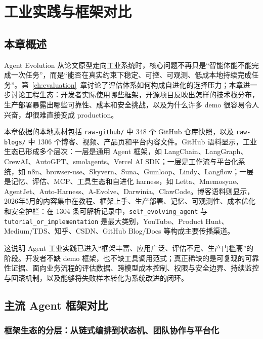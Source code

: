 
\section{工业实践与框架对比}\label{ch:industry}

\subsection{本章概述}\label{sec:ch6-overview}

Agent Evolution 从论文原型走向工业系统时，核心问题不再只是``智能体能不能完成一次任务''，而是``能否在真实约束下稳定、可控、可观测、低成本地持续完成任务''。第~\ref{ch:evaluation}~章讨论了评估体系如何构成自进化的选择压力；本章进一步讨论工程生态：开发者实际使用哪些框架，开源项目反映出怎样的技术栈分布，生产部署暴露出哪些可靠性、成本和安全挑战，以及为什么许多 demo 很容易令人兴奋，却很难直接变成 production。

本章依据的本地素材包括 \texttt{raw-github/} 中 348 个 GitHub 仓库快照，以及 \texttt{raw-blogs/} 中 1306 个博客、视频、产品页和平台内容文件。GitHub 语料显示，工业生态已形成多个层次：一层是通用 Agent 框架，如 LangChain、LangGraph、CrewAI、AutoGPT、smolagents、Vercel AI SDK；一层是工作流与平台化系统，如 n8n、browser-use、Skyvern、Suna、Gumloop、Lindy、Langflow；一层是记忆、评估、MCP、工具生态和自进化 harness，如 Letta、Mnemosyne、AgentJet、Auto-Harness、A-Evolve、Darwinia、ClawCode。博客语料则显示，2026年5月的内容集中在教程、框架上手、生产部署、记忆、可观测性、成本优化和安全护栏：在 1304 条可解析记录中，\texttt{self\_evolving\_agent} 与 \texttt{tutorial\_or\_implementation} 是最大类别，YouTube、Product Hunt、Medium/TDS、知乎、CSDN、GitHub Blog/Docs 等构成主要传播渠道。

这说明 Agent 工业实践已进入``框架丰富、应用广泛、评估不足、生产门槛高''的阶段。开发者不缺 demo 框架，也不缺工具调用范式；真正稀缺的是可复现的可靠性证据、面向业务流程的评估数据、跨模型成本控制、权限与安全边界、持续监控与回滚机制，以及能够将失败样本转化为系统改进的闭环。

\subsection{主流 Agent 框架对比}\label{sec:ch6-frameworks}

\subsubsection{框架生态的分层：从链式编排到状态机、团队协作与平台化}


